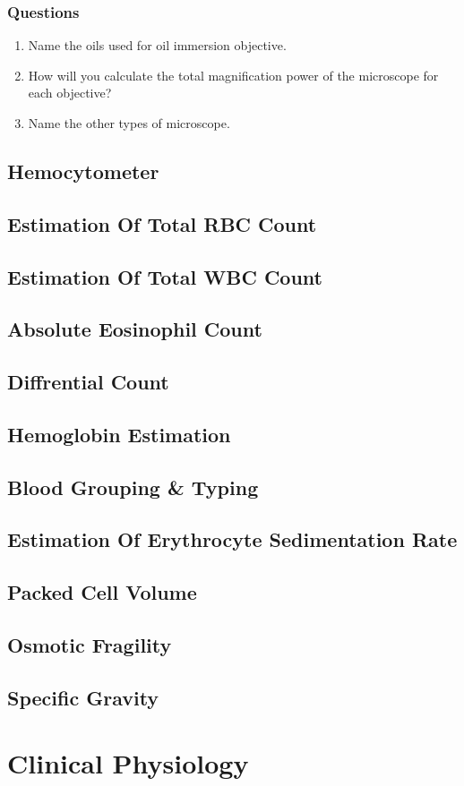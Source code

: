 \documentclass[12pt]{book}
\begin{document}
\section{Questions}
\begin{enumerate}
\item Name the oils used for oil immersion objective.
\item How will you calculate the total magnification power of the microscope for each objective?
\item Name the other types of microscope.
\end{enumerate}

\chapter{Hemocytometer}
\chapter{Estimation Of Total RBC Count}
\chapter{Estimation Of Total WBC Count}
\chapter{Absolute Eosinophil Count}
\chapter{Diffrential Count}
\chapter{Hemoglobin Estimation}
\chapter{Blood Grouping \& Typing}
\chapter{Estimation Of Erythrocyte Sedimentation Rate}
\chapter{Packed Cell Volume}
\chapter{Osmotic Fragility}
\chapter{Specific Gravity}

\part{Clinical Physiology}
\end{document}
